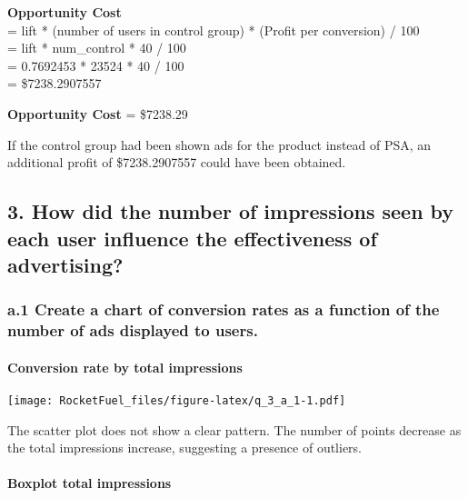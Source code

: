 \documentclass[
]{article}
\begin{document}
\textbf{Opportunity Cost}\\
= lift * (number of users in control group) * (Profit per conversion) /
100\\
= lift * num\_control * 40 / 100\\
= 0.7692453 * 23524 * 40 / 100\\
= \$7238.2907557

\textbf{Opportunity Cost} = \$7238.29

If the control group had been shown ads for the product instead of PSA,
an additional profit of \$7238.2907557 could have been obtained.

\hypertarget{how-did-the-number-of-impressions-seen-by-each-user-influence-the-effectiveness-of-advertising}{%
\subsection{3. How did the number of impressions seen by each user
influence the effectiveness of
advertising?}\label{how-did-the-number-of-impressions-seen-by-each-user-influence-the-effectiveness-of-advertising}}

\hypertarget{a.1-create-a-chart-of-conversion-rates-as-a-function-of-the-number-of-ads-displayed-to-users.}{%
\subsubsection{a.1 Create a chart of conversion rates as a function of
the number of ads displayed to
users.}\label{a.1-create-a-chart-of-conversion-rates-as-a-function-of-the-number-of-ads-displayed-to-users.}}

\hypertarget{conversion-rate-by-total-impressions}{%
\paragraph{Conversion rate by total
impressions}\label{conversion-rate-by-total-impressions}}

\texttt{[image: RocketFuel\_files/figure-latex/q\_3\_a\_1-1.pdf]}

The scatter plot does not show a clear pattern. The number of points
decrease as the total impressions increase, suggesting a presence of
outliers.

\hypertarget{boxplot-total-impressions}{%
\paragraph{Boxplot total impressions}\label{boxplot-total-impressions}}
\end{document}
